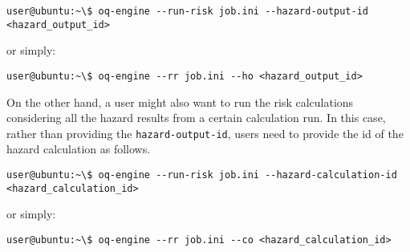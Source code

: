\begin{Verbatim}[frame=single, commandchars=\\\{\}, samepage=true]
user@ubuntu:~\$ oq-engine --run-risk job.ini --hazard-output-id
<hazard_output_id>
\end{Verbatim}

or simply:

\begin{Verbatim}[frame=single, commandchars=\\\{\}, samepage=true]
user@ubuntu:~\$ oq-engine --rr job.ini --ho <hazard_output_id>
\end{Verbatim}

On the other hand, a user might also want to run the risk calculations
considering all the hazard results from a certain calculation run. In this
case, rather than providing the \verb+hazard-output-id+, users need to provide
the id of the hazard calculation as follows.

\begin{Verbatim}[frame=single, commandchars=\\\{\}, samepage=true]
user@ubuntu:~\$ oq-engine --run-risk job.ini --hazard-calculation-id
<hazard_calculation_id>
\end{Verbatim}

or simply:

\begin{Verbatim}[frame=single, commandchars=\\\{\}, samepage=true]
user@ubuntu:~\$ oq-engine --rr job.ini --co <hazard_calculation_id>
\end{Verbatim}